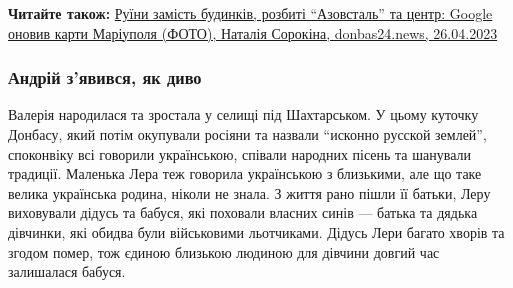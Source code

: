 \textbf{Читайте також:} \href{https://donbas24.news/news/ruyini-zamist-budinkiv-rozbiti-azovstal-ta-centr-google-onoviv-karti-mariupolya-foto}{%
Руїни замість будинків, розбиті \enquote{Азовсталь} та центр: Google оновив карти Маріуполя (ФОТО), %
Наталія Сорокіна, donbas24.news, 26.04.2023%
}

\subsubsection{Андрій з'явився, як диво}

Валерія народилася та зростала у селищі під Шахтарськом. У цьому куточку
Донбасу, який потім окупували росіяни та назвали \enquote{исконно русской землей},
споконвіку всі говорили українською, співали народних пісень та шанували
традиції. Маленька Лера теж говорила українською з близькими, але що таке
велика українська родина, ніколи не знала. З життя рано пішли її батьки, Леру
виховували дідусь та бабуся, які поховали власних синів — батька та дядька
дівчинки, які обидва були військовими льотчиками. Дідусь Лери багато хворів та
згодом помер, тож єдиною близькою людиною для дівчини довгий час залишалася
бабуся.
